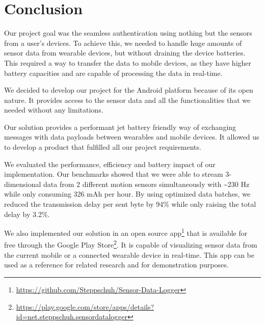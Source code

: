 \section{Conclusion}
\label{sec:conclusion}

Our project goal was the seamless authentication using nothing but the sensors from a user's devices.
To achieve this, we needed to handle huge amounts of sensor data from wearable devices, but without draining the device batteries.
This required a way to transfer the data to mobile devices, as they have higher battery capacities and are capable of processing the data in real-time.

We decided to develop our project for the Android platform because of its open nature.
It provides access to the sensor data and all the functionalities that we needed without any limitations.

Our solution provides a performant jet battery friendly way of exchanging messages with data payloads between wearables and mobile devices.
It allowed us to develop a product that fulfilled all our project requirements.

We evaluated the performance, efficiency and battery impact of our implementation.
Our benchmarks showed that we were able to stream 3-dimensional data from 2 different motion sensors simultaneously with \textasciitilde230 Hz while only consuming 326 mAh per hour.
By using optimized data batches, we reduced the transmission delay per sent byte by 94\% while only raising the total delay by 3.2\%.

We also implemented our solution in an open source app\footnote{\href{https://github.com/Steppschuh/Sensor-Data-Logger}{https://github.com/Steppschuh/Sensor-Data-Logger}} that is available for free through the Google Play Store\footnote{\href{https://play.google.com/store/apps/details?id=net.steppschuh.sensordatalogger}{https://play.google.com/store/apps/details?id=net.steppschuh.sensordatalogger}}.
It is capable of visualizing sensor data from the current mobile or a connected wearable device in real-time.
This app can be used as a reference for related research and for demonstration purposes.

\clearpage